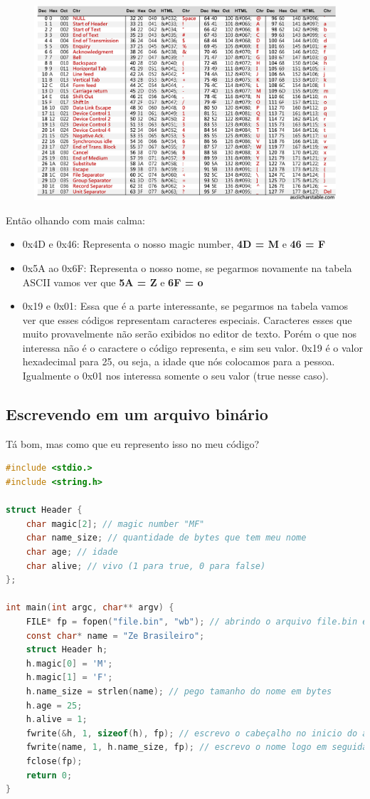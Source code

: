 \documentclass[a4paper,oneside,12pt]{article}
\begin{document}
\begin{figure}[h]
    \centering
    \includegraphics[width=\linewidth]{ASCII.jpg}
\end{figure}

Então olhando com mais calma:
\begin{itemize}
    \item 0x4D e 0x46: Representa o nosso magic number, \textbf{4D = M} e \textbf{46 = F}
    \item 0x5A ao 0x6F: Representa o nosso nome, se pegarmos novamente na tabela ASCII vamos ver que \textbf{5A = Z} e \textbf{6F = o}
    \item 0x19 e 0x01: Essa que é a parte interessante, se pegarmos na tabela vamos ver que esses códigos representam caracteres especiais. Caracteres esses que muito provavelmente não serão exibidos no editor de texto. Porém o que nos interessa não é o caractere o código representa, e sim seu valor. 0x19 é o valor hexadecimal para 25, ou seja, a idade que nós colocamos para a pessoa. Igualmente o 0x01 nos interessa somente o seu valor (true nesse caso).
\end{itemize}

\subsection{Escrevendo em um arquivo binário}

Tá bom, mas como que eu represento isso no meu código?

\begin{lstlisting}[language=C, caption=Exemplo de escrita em C]
#include <stdio.>
#include <string.h>

struct Header {
    char magic[2]; // magic number "MF"
    char name_size; // quantidade de bytes que tem meu nome
    char age; // idade
    char alive; // vivo (1 para true, 0 para false)
};

int main(int argc, char** argv) {
    FILE* fp = fopen("file.bin", "wb"); // abrindo o arquivo file.bin em modo de escrita binária
    const char* name = "Ze Brasileiro";
    struct Header h;
    h.magic[0] = 'M';
    h.magic[1] = 'F';
    h.name_size = strlen(name); // pego tamanho do nome em bytes
    h.age = 25;
    h.alive = 1;
    fwrite(&h, 1, sizeof(h), fp); // escrevo o cabeçalho no inicio do arquivo
    fwrite(name, 1, h.name_size, fp); // escrevo o nome logo em seguida
    fclose(fp);
    return 0;
}
\end{lstlisting}
\end{document}
